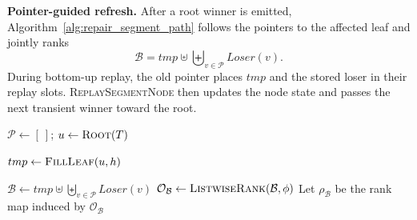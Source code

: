 \noindent\textbf{Pointer-guided refresh.}
After a root winner is emitted, Algorithm~\ref{alg:repair_segment_path}
follows the pointers to the affected leaf and jointly ranks
\[
  \mathcal B
  =
  tmp\uplus\biguplus_{v\in\mathcal P}\mathit{Loser}(v).
\]
During bottom-up replay, the old pointer places $tmp$ and the stored loser
in their replay slots.  \textsc{ReplaySegmentNode} then updates the node
state and passes the next transient winner toward the root.
\begin{algorithm}[t]
\small
\caption{Pointer-Guided Path Refresh}
\label{alg:repair_segment_path}

$\mathcal P\gets[\ ]$; $u\gets\textsc{Root}(T)$\;

\;
$tmp\gets\textsc{FillLeaf}(u,h)$\;

\;
$\mathcal B\gets
  tmp\uplus\biguplus_{v\in\mathcal P}\mathit{Loser}(v)$\;
$\mathcal O_{\mathcal B}
  \gets\textsc{ListwiseRank}(\mathcal B,\phi)$
  \;
Let $\rho_{\mathcal B}$ be the rank map induced by
$\mathcal O_{\mathcal B}$\;

\;

\;
\end{algorithm}


